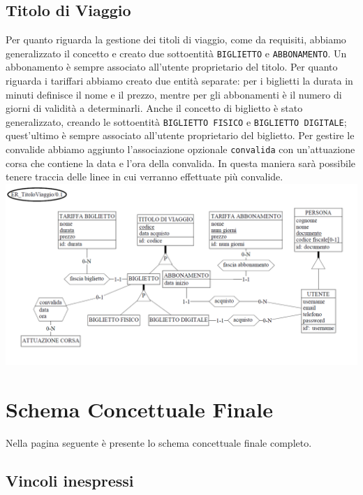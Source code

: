 \documentclass[12pt,a4paper]{report}
\begin{document}
\subsection{Titolo di Viaggio}
Per quanto riguarda la gestione dei titoli di viaggio, come da requisiti, abbiamo generalizzato il concetto e creato due sottoentità \texttt{BIGLIETTO} e \texttt{ABBONAMENTO}. Un abbonamento è sempre associato all'utente proprietario del titolo. Per quanto riguarda i tariffari abbiamo creato due entità separate: per i biglietti la durata in minuti definisce il nome e il prezzo, mentre per gli abbonamenti è il numero di giorni di validità a determinarli. Anche il concetto di biglietto è stato generalizzato, creando le sottoentità \texttt{BIGLIETTO FISICO} e \texttt{BIGLIETTO DIGITALE}; quest'ultimo è sempre associato all'utente proprietario del biglietto. Per gestire le convalide abbiamo aggiunto l'associazione opzionale \texttt{convalida} con un'attuazione corsa che contiene la data e l'ora della convalida. In questa maniera sarà possibile tenere traccia delle linee in cui verranno effettuate più convalide.
\\
\includegraphics[width=1.0\textwidth]{prog_conc/TitoliViaggio}

\section{Schema Concettuale Finale}
Nella pagina seguente è presente lo schema concettuale finale completo.


\subsection{Vincoli inespressi}\label{section:VincoliInespressi}
\end{document}
